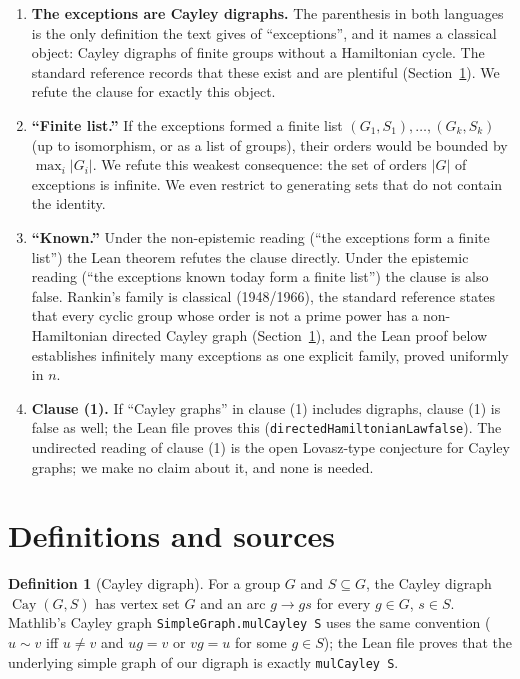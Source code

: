 \documentclass[11pt]{article}
\theoremstyle{definition}
\newtheorem{definition}[theorem]{Definition}
\theoremstyle{remark}
\renewcommand{\_}{\oldus\allowbreak}
\newcommand{\Cay}{\operatorname{Cay}}
\begin{document}
\begin{enumerate}[label=(\alph*)]
\item \textbf{The exceptions are Cayley digraphs.} The parenthesis in both languages is the only
  definition the text gives of ``exceptions'', and it names a classical object: Cayley digraphs of
  finite groups without a Hamiltonian cycle. The standard reference records that these exist and are
  plentiful (Section~\ref{sec:sources}). We refute the clause for exactly this object.
\item \textbf{``Finite list.''} If the exceptions formed a finite list $(G_1,S_1),\dots,(G_k,S_k)$
  (up to isomorphism, or as a list of groups), their orders would be bounded by $\max_i |G_i|$. We
  refute this weakest consequence: the set of orders $|G|$ of exceptions is infinite. We even restrict
  to generating sets that do not contain the identity.
\item \textbf{``Known.''} Under the non-epistemic reading (``the exceptions form a finite list'') the
  Lean theorem refutes the clause directly. Under the epistemic reading (``the exceptions known today
  form a finite list'') the clause is also false. Rankin's family is classical (1948/1966), the
  standard reference states that every cyclic group whose order is not a prime power has a
  non-Hamiltonian directed Cayley graph (Section~\ref{sec:sources}), and the Lean proof below
  establishes infinitely many exceptions as one explicit family, proved uniformly in $n$.
\item \textbf{Clause (1).} If ``Cayley graphs'' in clause (1) includes digraphs, clause (1) is false as
  well; the Lean file proves this (\texttt{directedHamiltonianLaw\_false}). The undirected reading of
  clause (1) is the open Lovasz-type conjecture for Cayley graphs; we make no claim about it, and none is
  needed.
\end{enumerate}

\section{Definitions and sources}\label{sec:sources}

\begin{definition}[Cayley digraph]
For a group $G$ and $S \subseteq G$, the Cayley digraph $\Cay(G,S)$ has vertex set $G$ and an arc
$g \to gs$ for every $g\in G$, $s\in S$. Mathlib's Cayley graph \texttt{SimpleGraph.mulCayley S} uses the
same convention ($u \sim v$ iff $u\neq v$ and $ug=v$ or $vg=u$ for some $g\in S$); the Lean file proves that
the underlying simple graph of our digraph is exactly \texttt{mulCayley S}.
\end{definition}
\end{document}
